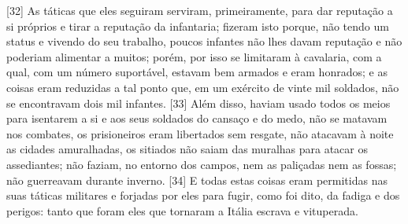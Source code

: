 {[}32{]} As táticas que eles seguiram serviram, primeiramente, para dar
reputação a si próprios e tirar a reputação da infantaria; fizeram isto
porque, não tendo um status e vivendo do seu trabalho, poucos infantes
não lhes davam reputação e não poderiam alimentar a muitos; porém, por
isso se limitaram à cavalaria, com a qual, com um número suportável,
estavam bem armados e eram honrados; e as coisas eram reduzidas a tal
ponto que, em um exército de vinte mil soldados, não se encontravam dois
mil infantes. {[}33{]} Além disso, haviam usado todos os meios
para isentarem a si e aos seus soldados do cansaço e do medo, não se
matavam nos combates, os prisioneiros eram libertados sem resgate, não
atacavam à noite as cidades amuralhadas, os sitiados não
saiam das muralhas para atacar os assediantes; não faziam, no entorno
dos campos, nem as paliçadas nem as fossas; não guerreavam durante
inverno. {[}34{]} E todas estas coisas eram permitidas nas suas táticas
militares e forjadas por eles para fugir, como foi dito, da fadiga e dos
perigos: tanto que foram eles que tornaram a Itália escrava e vituperada.


